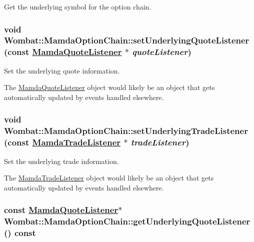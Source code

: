Get the underlying symbol for the option chain. 

\hypertarget{classWombat_1_1MamdaOptionChain_5a4d5775be29a6f0e63d40723c9f2a0e}{
\subsubsection[setUnderlyingQuoteListener]{\setlength{\rightskip}{0pt plus 5cm}void Wombat::Mamda\-Option\-Chain::set\-Underlying\-Quote\-Listener (const \hyperlink{classWombat_1_1MamdaQuoteListener}{Mamda\-Quote\-Listener} $\ast$ {\em quote\-Listener})}}
\label{classWombat_1_1MamdaOptionChain_5a4d5775be29a6f0e63d40723c9f2a0e}


Set the underlying quote information. 

The \hyperlink{classWombat_1_1MamdaQuoteListener}{Mamda\-Quote\-Listener} object would likely be an object that gets automatically updated by events handled elsewhere. \hypertarget{classWombat_1_1MamdaOptionChain_5402589f97170ab7b23cdc6d6444043b}{
\subsubsection[setUnderlyingTradeListener]{\setlength{\rightskip}{0pt plus 5cm}void Wombat::Mamda\-Option\-Chain::set\-Underlying\-Trade\-Listener (const \hyperlink{classWombat_1_1MamdaTradeListener}{Mamda\-Trade\-Listener} $\ast$ {\em trade\-Listener})}}
\label{classWombat_1_1MamdaOptionChain_5402589f97170ab7b23cdc6d6444043b}


Set the underlying trade information. 

The \hyperlink{classWombat_1_1MamdaTradeListener}{Mamda\-Trade\-Listener} object would likely be an object that gets automatically updated by events handled elsewhere. \hypertarget{classWombat_1_1MamdaOptionChain_0eaa6dd3566c4ef4307c111196b052a7}{
\subsubsection[getUnderlyingQuoteListener]{\setlength{\rightskip}{0pt plus 5cm}const \hyperlink{classWombat_1_1MamdaQuoteListener}{Mamda\-Quote\-Listener}$\ast$ Wombat::Mamda\-Option\-Chain::get\-Underlying\-Quote\-Listener () const}}
\label{classWombat_1_1MamdaOptionChain_0eaa6dd3566c4ef4307c111196b052a7}


